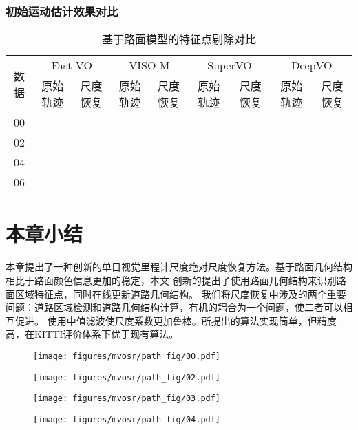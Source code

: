 \subsubsection{初始运动估计效果对比}
\begin{table}[h]
    \caption{基于路面模型的特征点剔除对比}
    \label{tab:flat_removal}
    \begin{center}
    \begin{tabular}{ccccccccc}
    \hline
    \multirow{2}{*}{数据} & \multicolumn{2}{c}{Fast-VO} & \multicolumn{2}{c}{VISO-M} & \multicolumn{2}{c}{SuperVO} & \multicolumn{2}{c}{DeepVO} \\
     \cline{2-3} \cline{4-5}  \cline{6-7}    \cline{8-9} 
    & 原始轨迹   & 尺度恢复  & 原始轨迹   & 尺度恢复 & 原始轨迹   & 尺度恢复 & 原始轨迹   & 尺度恢复   \\ \hline
  00&\\
  02&\\
  04&\\
  06&\\  
    \end{tabular}
\end{center}
\end{table}

\section{本章小结}
本章提出了一种创新的单目视觉里程计尺度绝对尺度恢复方法。基于路面几何结构相比于路面颜色信息更加的稳定，本文
创新的提出了使用路面几何结构来识别路面区域特征点，同时在线更新道路几何结构。
我们将尺度恢复中涉及的两个重要问题：道路区域检测和道路几何结构计算，有机的耦合为一个问题，使二者可以相互促进。
使用中值滤波使尺度系数更加鲁棒。所提出的算法实现简单，但精度高，在KITTI评价体系下优于现有算法。

\begin{subfigure}[b]{0.18\textwidth}
    \texttt{[image: figures/mvosr/path\_fig/00.pdf]}
\end{subfigure}
    \begin{subfigure}[b]{0.18\textwidth}
\texttt{[image: figures/mvosr/path\_fig/02.pdf]}
\end{subfigure}

\begin{subfigure}[b]{0.18\textwidth}
    \texttt{[image: figures/mvosr/path\_fig/03.pdf]}
\end{subfigure}

\begin{subfigure}[b]{0.18\textwidth}
    \texttt{[image: figures/mvosr/path\_fig/04.pdf]}
\end{subfigure}

